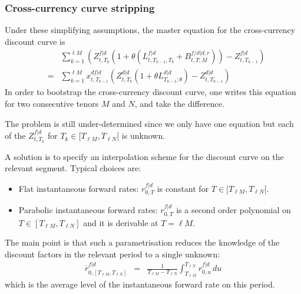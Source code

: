 \documentclass[11pt,english]{amsart}
\newcommand{\f}{\ell}
\theoremstyle{definition}
\begin{document}
\subsubsection{Cross-currency curve stripping\label{ssec:dd_curve_stripping}}%
Under these simplifying assumptions, the master equation for the cross-currency discount curve is 
\begin{eqnarray}
  & & \sum_{k=1}^{\f M} \left(  Z^{f|d}_{t,T_k} \left(1+\theta (L^{f|d}_{t,T_{k-1},T_k} + B^{f/d|d,r}_{t,T;M}) \right) - Z^{f|d}_{t,T_{k-1}} \right) \nonumber \\
  &=& 
  \sum_{k=1}^{\f M} x^{df|d}_{t,T_{k-1}} \left( Z^{d|d}_{t,T_k} (1+\theta L^{d|d}_{T_{k-1};\theta}) - Z^{d|d}_{t,T_{k-1}} \right) 
  \label{eq:dcb_xccy_master}
\end{eqnarray}
In order to bootstrap the cross-currency discount curve, one writes this equation for two consecutive tenors $M$ and $N$, and take the difference. 

The problem is still under-determined since we only have one equation but each of the $Z^{f|d}_{t,T_k}$ for $T_k \in [T_{\f M},T_{\f N}[$ is unknown. 
 
A solution is to specify an interpolation scheme for the discount curve on the relevant segment. Typical choices are:
\begin{itemize}
\item Flat instantaneous forward rates: $r^{f|d}_{0,T}$ is constant for $T \in [T_{\f M},T_{\f N}[$. 
\item Parabolic instantaneous forward rates: $r^{f|d}_{0,T}$ is a second order polynomial on $T \in [T_{\f M},T_{\f N}]$ and it is derivable at $T = \f M$.  
\end{itemize}
The main point is that such a parametrisation reduces the knowledge of the discount factors in the relevant period to a single unknown:
\begin{eqnarray}
  \overline{r}^{f|d}_{0,[T_{\f M},T_{\f N}]} &=& \frac{1}{T_{\f M} - T_{\f N}} \int_{T_{\f M}}^{T_{\f N}} r^{f|d}_{0,u} \, du
\end{eqnarray}
which is the average level of the instantaneous forward rate on this period. 
\end{document}

